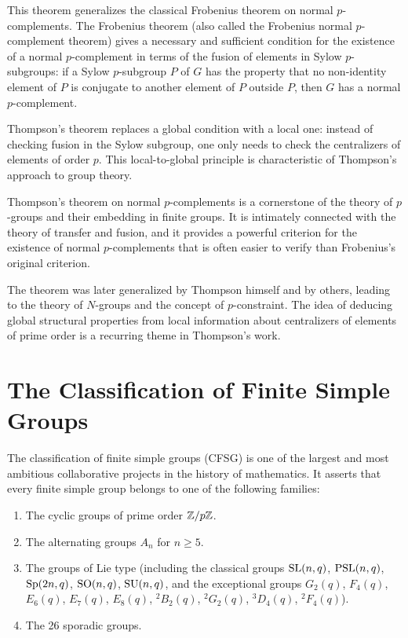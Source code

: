 This theorem generalizes the classical Frobenius theorem on normal \(p\)-complements. The Frobenius theorem (also called the Frobenius normal \(p\)-complement theorem) gives a necessary and sufficient condition for the existence of a normal \(p\)-complement in terms of the fusion of elements in Sylow \(p\)-subgroups: if a Sylow \(p\)-subgroup \(P\) of \(G\) has the property that no non-identity element of \(P\) is conjugate to another element of \(P\) outside \(P\), then \(G\) has a normal \(p\)-complement.

Thompson's theorem replaces a global condition with a local one: instead of checking fusion in the Sylow subgroup, one only needs to check the centralizers of elements of order \(p\). This local-to-global principle is characteristic of Thompson's approach to group theory.

Thompson's theorem on normal \(p\)-complements is a cornerstone of the theory of \(p\)-groups and their embedding in finite groups. It is intimately connected with the theory of transfer and fusion, and it provides a powerful criterion for the existence of normal \(p\)-complements that is often easier to verify than Frobenius's original criterion.

The theorem was later generalized by Thompson himself and by others, leading to the theory of \(N\)-groups and the concept of \(p\)-constraint. The idea of deducing global structural properties from local information about centralizers of elements of prime order is a recurring theme in Thompson's work.

\section{The Classification of Finite Simple Groups}

The classification of finite simple groups (CFSG) is one of the largest and most ambitious collaborative projects in the history of mathematics. It asserts that every finite simple group belongs to one of the following families:

\begin{enumerate}
\item The cyclic groups of prime order \(\mathbb{Z}/p\mathbb{Z}\).
\item The alternating groups \(A_n\) for \(n \geq 5\).
\item The groups of Lie type (including the classical groups \(\operatorname{SL}(n,q)\), \(\operatorname{PSL}(n,q)\), \(\operatorname{Sp}(2n,q)\), \(\operatorname{SO}(n,q)\), \(\operatorname{SU}(n,q)\), and the exceptional groups \(G_2(q)\), \(F_4(q)\), \(E_6(q)\), \(E_7(q)\), \(E_8(q)\), \({}^2B_2(q)\), \({}^2G_2(q)\), \({}^3D_4(q)\), \({}^2F_4(q)\)).
\item The 26 sporadic groups.
\end{enumerate}

